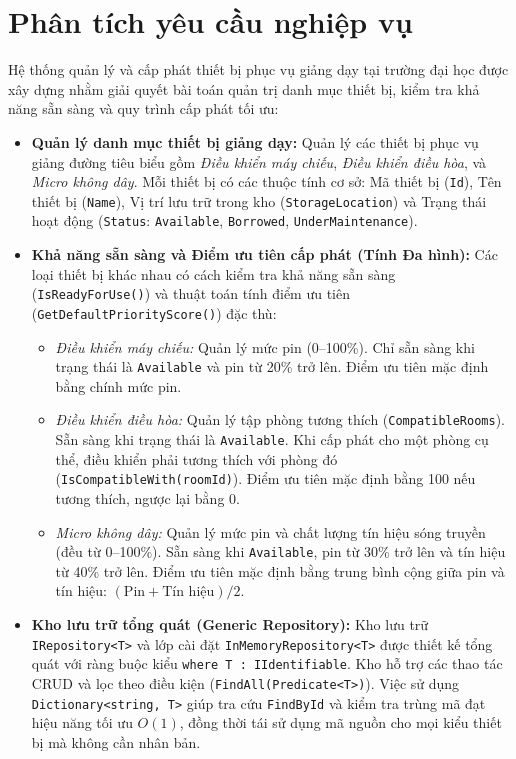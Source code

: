 \documentclass[11pt,a4paper]{article}
\begin{document}
\section{Phân tích yêu cầu nghiệp vụ}
Hệ thống quản lý và cấp phát thiết bị phục vụ giảng dạy tại trường đại học được xây dựng nhằm giải quyết bài toán quản trị danh mục thiết bị, kiểm tra khả năng sẵn sàng và quy trình cấp phát tối ưu:
\begin{itemize}[itemsep=2.5pt]
    \item \textbf{Quản lý danh mục thiết bị giảng dạy:} Quản lý các thiết bị phục vụ giảng đường tiêu biểu gồm \textit{Điều khiển máy chiếu}, \textit{Điều khiển điều hòa}, và \textit{Micro không dây}. Mỗi thiết bị có các thuộc tính cơ sở: Mã thiết bị (\texttt{Id}), Tên thiết bị (\texttt{Name}), Vị trí lưu trữ trong kho (\texttt{StorageLocation}) và Trạng thái hoạt động (\texttt{Status}: \texttt{Available}, \texttt{Borrowed}, \texttt{UnderMaintenance}).
    
    \item \textbf{Khả năng sẵn sàng và Điểm ưu tiên cấp phát (Tính Đa hình):} Các loại thiết bị khác nhau có cách kiểm tra khả năng sẵn sàng (\texttt{IsReadyForUse()}) và thuật toán tính điểm ưu tiên (\texttt{GetDefaultPriorityScore()}) đặc thù:
    \begin{itemize}[itemsep=1.5pt]
        \item \textit{Điều khiển máy chiếu:} Quản lý mức pin (0--100\%). Chỉ sẵn sàng khi trạng thái là \texttt{Available} và pin từ 20\% trở lên. Điểm ưu tiên mặc định bằng chính mức pin.
        \item \textit{Điều khiển điều hòa:} Quản lý tập phòng tương thích (\texttt{CompatibleRooms}). Sẵn sàng khi trạng thái là \texttt{Available}. Khi cấp phát cho một phòng cụ thể, điều khiển phải tương thích với phòng đó (\texttt{IsCompatibleWith(roomId)}). Điểm ưu tiên mặc định bằng 100 nếu tương thích, ngược lại bằng 0.
        \item \textit{Micro không dây:} Quản lý mức pin và chất lượng tín hiệu sóng truyền (đều từ 0--100\%). Sẵn sàng khi \texttt{Available}, pin từ 30\% trở lên và tín hiệu từ 40\% trở lên. Điểm ưu tiên mặc định bằng trung bình cộng giữa pin và tín hiệu: $(\text{Pin} + \text{Tín hiệu}) / 2$.
    \end{itemize}

    \item \textbf{Kho lưu trữ tổng quát (Generic Repository):} Kho lưu trữ \texttt{IRepository<T>} và lớp cài đặt \texttt{InMemoryRepository<T>} được thiết kế tổng quát với ràng buộc kiểu \texttt{where T : IIdentifiable}. Kho hỗ trợ các thao tác CRUD và lọc theo điều kiện (\texttt{FindAll(Predicate<T>)}). Việc sử dụng \texttt{Dictionary<string, T>} giúp tra cứu \texttt{FindById} và kiểm tra trùng mã đạt hiệu năng tối ưu $O(1)$, đồng thời tái sử dụng mã nguồn cho mọi kiểu thiết bị mà không cần nhân bản.


\end{itemize}
\end{document}
